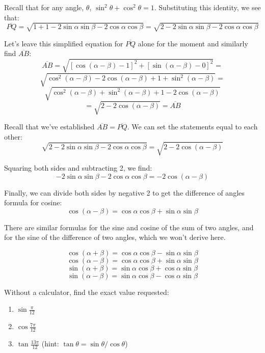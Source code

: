 Recall that for any angle, $\theta$, $\sin^2{\theta} + \cos^2{\theta} = 1$. 
Substituting this identity, we see that:
$$\overline{PQ} = \sqrt{1 + 1 -2\sin{\alpha}\sin{\beta} - 2\cos{\alpha}\cos{
\beta}} = \sqrt{2 - 2\sin{\alpha}\sin{\beta} - 2\cos{\alpha}\cos{\beta}}$$

Let's leave this simplified equation for $\overline{PQ}$ alone for the moment 
and similarly find $\overline{AB}$:
$$\overline{AB} = \sqrt{\left[ \cos{\left( \alpha - \beta \right)} - 1 \right]^
2 + \left[ \sin{\left( \alpha - \beta \right)} - 0 \right]^2} = $$
$$\sqrt{\cos^2{ \left( \alpha - \beta \right)} - 2\cos{ \left( \alpha - \beta 
\right)} + 1 + \sin^2{ \left( \alpha - \beta \right)}} = $$
$$\sqrt{\cos^2{ \left( \alpha - \beta \right)} + \sin^2{ \left( \alpha - \beta 
\right)} + 1 - 2\cos{ \left( \alpha - \beta \right)}} $$
$$= \sqrt{2 - 2\cos{ \left( \alpha - \beta \right)}} = \overline{AB}$$

Recall that we've established $\overline{AB} = \overline{PQ}$. We can set 
the statements equal to each other:
$$ \sqrt{2 - 2\sin{\alpha}\sin{\beta} - 2\cos{\alpha}\cos{\beta}} = \sqrt{2 - 2
\cos{ \left( \alpha - \beta \right)}}$$

Squaring both sides and subtracting 2, we find:
$$-2\sin{\alpha}\sin{\beta} - 2\cos{\alpha}\cos{\beta} = -2\cos{\left( \alpha -
\beta \right)}$$

Finally, we can divide both sides by negative 2 to get the difference of 
angles formula for cosine:
$$\cos{ \left( \alpha - \beta \right)} = \cos{\alpha}\cos{\beta} + \sin{\alpha}
\sin{\beta}$$

There are similar formulas for the sine and cosine of the sum of two angles, and
for the sine of the difference of two angles, which we won't derive here. 

\begin{mdframed}[style=important, frametitle={Sum and Difference Formulas}]
$$\cos{ \left( \alpha + \beta \right)} = \cos{\alpha}\cos{\beta} - \sin{\alpha}
\sin{\beta}$$
$$\cos{ \left( \alpha - \beta \right)} = \cos{\alpha}\cos{\beta} + \sin{\alpha}
\sin{\beta}$$
$$\sin{ \left( \alpha + \beta \right)} = \sin{\alpha}\cos{\beta} + \cos{\alpha}
\sin{\beta}$$
$$\sin{ \left( \alpha - \beta \right)} = \sin{\alpha}\cos{\beta} - \cos{\alpha}
\sin{\beta}$$
\end{mdframed}

\begin{Exercise}[label = sum_diff]
Without a calculator, find the exact value requested:
\begin{enumerate}
\item $\sin{\frac{\pi}{12}}$
\item $\cos{\frac{7\pi}{12}}$
\item $\tan{\frac{13\pi}{12}}$ (hint: $\tan{\theta} = \sin{\theta}/\cos{\theta}
$)
\end{enumerate}
\end{Exercise}

